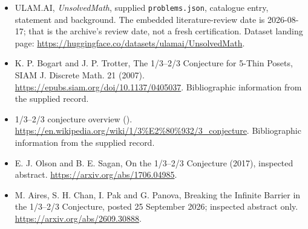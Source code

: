 \documentclass[11pt,a4paper]{article}
\begin{document}
{\small

\begin{itemize}

\item[\hypertarget{source:statement:1}{S1}] ULAM.AI, \emph{UnsolvedMath}, supplied \texttt{problems.json}, catalogue entry, statement and background. The embedded literature-review date is 2026-08-17; that is the archive’s review date, not a fresh certification. Dataset landing page: \url{https://huggingface.co/datasets/ulamai/UnsolvedMath}.

\item[\hypertarget{source:statement:2}{S2}] K. P. Bogart and J. P. Trotter, The 1/3--2/3 Conjecture for 5-Thin Posets, SIAM J. Discrete Math. 21 (2007). \url{https://epubs.siam.org/doi/10.1137/0405037}. Bibliographic information from the supplied record.

\item[\hypertarget{source:statement:3}{S3}] 1/3--2/3 conjecture overview (). \url{https://en.wikipedia.org/wiki/1/3%E2%80%932/3_conjecture}. Bibliographic information from the supplied record.

\item[R1] E. J. Olson and B. E. Sagan, On the 1/3--2/3 Conjecture (2017), inspected abstract.
\url{https://arxiv.org/abs/1706.04985}.
\item[R2] M. Aires, S. H. Chan, I. Pak and G. Panova, Breaking the Infinite Barrier in the 1/3--2/3 Conjecture, posted 25 September 2026; inspected abstract only.
\url{https://arxiv.org/abs/2609.30888}.
\end{itemize}

}

\label{end:statement}
\end{document}
